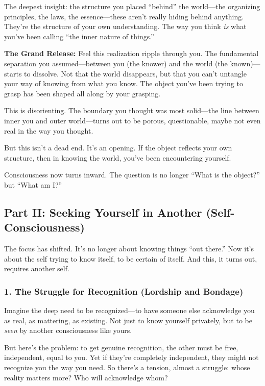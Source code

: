 The deepest insight: the structure you placed ``behind'' the world---the organizing principles, the laws, the essence---these aren't really hiding behind anything. They're the structure of your own understanding. The way you think \emph{is} what you've been calling ``the inner nature of things.''

\textbf{The Grand Release:} Feel this realization ripple through you. The fundamental separation you assumed---between you (the knower) and the world (the known)---starts to dissolve. Not that the world disappears, but that you can't untangle your way of knowing from what you know. The object you've been trying to grasp has been shaped all along by your grasping.

This is disorienting. The boundary you thought was most solid---the line between inner you and outer world---turns out to be porous, questionable, maybe not even real in the way you thought.

But this isn't a dead end. It's an opening. If the object reflects your own structure, then in knowing the world, you've been encountering yourself.

Consciousness now turns inward. The question is no longer ``What is the object?'' but ``What am I?''

\subsection{Part II: Seeking Yourself in Another (Self-Consciousness)}\label{part-ii-seeking-yourself-in-another-self-consciousness}

The focus has shifted. It's no longer about knowing things ``out there.'' Now it's about the self trying to know itself, to be certain of itself. And this, it turns out, requires another self.

\subsubsection{1. The Struggle for Recognition (Lordship and Bondage)}\label{the-struggle-for-recognition-lordship-and-bondage}

Imagine the deep need to be recognized---to have someone else acknowledge you as real, as mattering, as existing. Not just to know yourself privately, but to be \emph{seen} by another consciousness like yours.

But here's the problem: to get genuine recognition, the other must be free, independent, equal to you. Yet if they're completely independent, they might not recognize you the way you need. So there's a tension, almost a struggle: whose reality matters more? Who will acknowledge whom?

